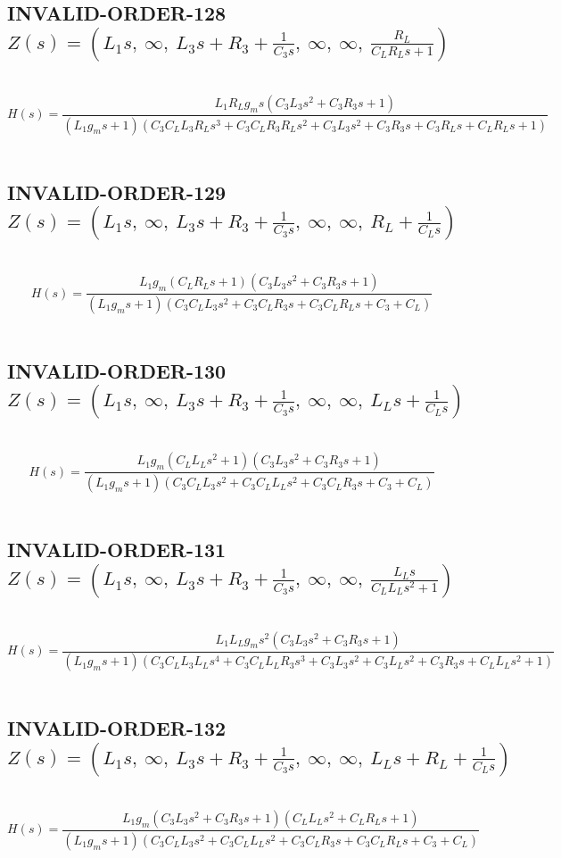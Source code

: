\documentclass{article}
\begin{document}
\subsection{INVALID-ORDER-128 $Z(s) = \left( L_{1} s, \  \infty, \  L_{3} s + R_{3} + \frac{1}{C_{3} s}, \  \infty, \  \infty, \  \frac{R_{L}}{C_{L} R_{L} s + 1}\right)$ } \ 
\textbf{\[H(s) = \frac{L_{1} R_{L} g_{m} s \left(C_{3} L_{3} s^{2} + C_{3} R_{3} s + 1\right)}{\left(L_{1} g_{m} s + 1\right) \left(C_{3} C_{L} L_{3} R_{L} s^{3} + C_{3} C_{L} R_{3} R_{L} s^{2} + C_{3} L_{3} s^{2} + C_{3} R_{3} s + C_{3} R_{L} s + C_{L} R_{L} s + 1\right)}\] } \ 
\subsection{INVALID-ORDER-129 $Z(s) = \left( L_{1} s, \  \infty, \  L_{3} s + R_{3} + \frac{1}{C_{3} s}, \  \infty, \  \infty, \  R_{L} + \frac{1}{C_{L} s}\right)$ } \ 
\textbf{\[H(s) = \frac{L_{1} g_{m} \left(C_{L} R_{L} s + 1\right) \left(C_{3} L_{3} s^{2} + C_{3} R_{3} s + 1\right)}{\left(L_{1} g_{m} s + 1\right) \left(C_{3} C_{L} L_{3} s^{2} + C_{3} C_{L} R_{3} s + C_{3} C_{L} R_{L} s + C_{3} + C_{L}\right)}\] } \ 
\subsection{INVALID-ORDER-130 $Z(s) = \left( L_{1} s, \  \infty, \  L_{3} s + R_{3} + \frac{1}{C_{3} s}, \  \infty, \  \infty, \  L_{L} s + \frac{1}{C_{L} s}\right)$ } \ 
\textbf{\[H(s) = \frac{L_{1} g_{m} \left(C_{L} L_{L} s^{2} + 1\right) \left(C_{3} L_{3} s^{2} + C_{3} R_{3} s + 1\right)}{\left(L_{1} g_{m} s + 1\right) \left(C_{3} C_{L} L_{3} s^{2} + C_{3} C_{L} L_{L} s^{2} + C_{3} C_{L} R_{3} s + C_{3} + C_{L}\right)}\] } \ 
\subsection{INVALID-ORDER-131 $Z(s) = \left( L_{1} s, \  \infty, \  L_{3} s + R_{3} + \frac{1}{C_{3} s}, \  \infty, \  \infty, \  \frac{L_{L} s}{C_{L} L_{L} s^{2} + 1}\right)$ } \ 
\textbf{\[H(s) = \frac{L_{1} L_{L} g_{m} s^{2} \left(C_{3} L_{3} s^{2} + C_{3} R_{3} s + 1\right)}{\left(L_{1} g_{m} s + 1\right) \left(C_{3} C_{L} L_{3} L_{L} s^{4} + C_{3} C_{L} L_{L} R_{3} s^{3} + C_{3} L_{3} s^{2} + C_{3} L_{L} s^{2} + C_{3} R_{3} s + C_{L} L_{L} s^{2} + 1\right)}\] } \ 
\subsection{INVALID-ORDER-132 $Z(s) = \left( L_{1} s, \  \infty, \  L_{3} s + R_{3} + \frac{1}{C_{3} s}, \  \infty, \  \infty, \  L_{L} s + R_{L} + \frac{1}{C_{L} s}\right)$ } \ 
\textbf{\[H(s) = \frac{L_{1} g_{m} \left(C_{3} L_{3} s^{2} + C_{3} R_{3} s + 1\right) \left(C_{L} L_{L} s^{2} + C_{L} R_{L} s + 1\right)}{\left(L_{1} g_{m} s + 1\right) \left(C_{3} C_{L} L_{3} s^{2} + C_{3} C_{L} L_{L} s^{2} + C_{3} C_{L} R_{3} s + C_{3} C_{L} R_{L} s + C_{3} + C_{L}\right)}\] } \ 
\end{document}
